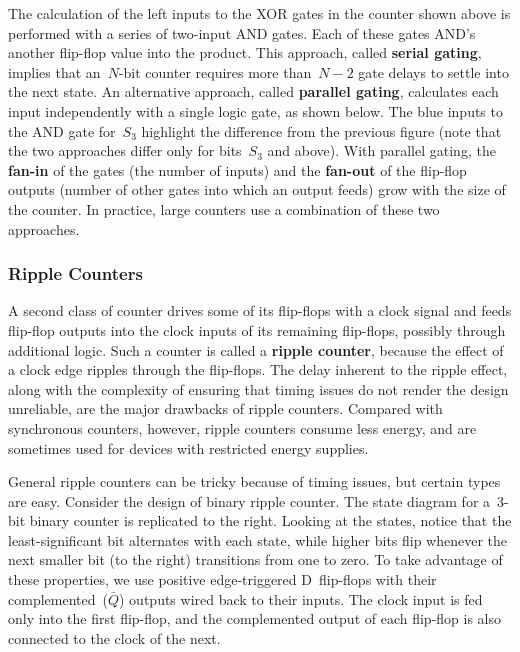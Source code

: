 \centerline{}\vspace{12pt}

The calculation of the left inputs to the XOR gates in the counter 
shown above is performed with a series of two-input AND gates.  Each 
of these gates AND's
another flip-flop value into the product.  This
approach, called {\bf serial gating}, implies that an~\mbox{$N$-bit}
counter requires more than~\mbox{$N-2$} gate delays
to settle into the next state.  An alternative approach, called
{\bf parallel gating}, calculates each input independently with a
single logic gate, as shown below.  The blue inputs to the AND gate
for~$S_3$ highlight the difference from the previous figure (note that
the two approaches differ only for bits~$S_3$ and above).
With parallel gating, the 
{\bf fan-in} of the gates (the number of inputs)
and the {\bf fan-out} of the flip-flop outputs (number of other gates
into which an output feeds) grow with the size of the counter.  
In practice, large counters use a combination of these two approaches.\\

\centerline{}


\subsubsection{Ripple Counters}

A second class of
counter drives some of its flip-flops with a clock signal and feeds
flip-flop outputs into the clock inputs of its remaining flip-flops,
possibly through additional logic.  Such a counter is called a {\bf
ripple counter}, because the effect of a clock edge ripples through
the flip-flops.  The delay inherent to the ripple effect, along with
the complexity of ensuring that timing issues do not render the design
unreliable, are the major drawbacks of ripple counters.  Compared with
synchronous counters, however, ripple counters consume less energy,
and are sometimes used for devices with restricted energy supplies.

\begin{minipage}{4.75in}
General ripple counters
can be tricky because of timing issues, but certain types are easy.
%
Consider the design of binary ripple counter.  The state diagram for 
a~\mbox{3-bit} binary counter is replicated to the right.
Looking
at the states, notice that the least-significant bit alternates with
each state, while higher bits flip whenever the next smaller bit (to
the right) transitions from one to zero.  To take advantage of these
properties, we use positive edge-triggered D~flip-flops with
their complemented~($\bar{Q}$) outputs wired back to their inputs.
The clock input is fed only into the first
flip-flop, and the complemented output of each flip-flop is also
connected to the clock of the next.
\end{minipage}\hspace{0.25in}%
\begin{minipage}{1.5in}
\end{minipage}

